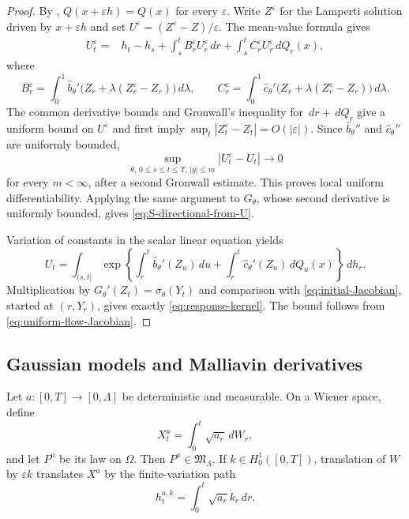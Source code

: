 \documentclass[11pt,reqno]{amsart}
\theoremstyle{plain}
\theoremstyle{definition}
\newcommand{\eps}{\varepsilon}
\newcommand{\dd}{\,d}
\newcommand{\abs}[1]{\left\lvert #1\right\rvert}
\begin{document}
\begin{proof}
By ,
\(Q(x+\eps h)=Q(x)\) for every \(\eps\).  Write \(Z^\eps\) for the
Lamperti solution driven by \(x+\eps h\) and set
\(U^\eps=(Z^\eps-Z)/\eps\).  The mean-value formula gives
\begin{align*}
  U_t^\eps
  ={}&h_t-h_s
  +\int_s^t B_r^\eps U_r^\eps\dd r
  +\int_s^t C_r^\eps U_r^\eps\dd Q_r(x),
\end{align*}
where
\[
  B_r^\eps
  =\int_0^1\widehat b_\theta'
    \bigl(Z_r+\lambda(Z_r^\eps-Z_r)\bigr)\dd\lambda,
  \qquad
  C_r^\eps
  =\int_0^1\widehat c_\theta'
    \bigl(Z_r+\lambda(Z_r^\eps-Z_r)\bigr)\dd\lambda.
\]
The common derivative bounds and Gronwall's inequality for
\(\dd r+\dd Q_r\) give a uniform bound on \(U^\eps\) and first imply
\(\sup_t\abs{Z_t^\eps-Z_t}=O(\abs\eps)\).  Since
\(\widehat b_\theta''\) and \(\widehat c_\theta''\) are uniformly bounded,
\[
  \sup_{\theta,\,0\le s\le t\le T,\,|y|\le m}
  \abs{U_t^\eps-U_t}
  \longrightarrow0
\]
for every \(m<\infty\), after a second Gronwall estimate.  This proves local
uniform differentiability.  Applying the same argument to \(G_\theta\),
whose second derivative is uniformly bounded, gives
\eqref{eq:S-directional-from-U}.

Variation of constants in the scalar linear equation yields
\[
  U_t
  =\int_{(s,t]}
  \exp\left\{
    \int_r^t\widehat b_\theta'(Z_u)\dd u
    +\int_r^t\widehat c_\theta'(Z_u)\dd Q_u(x)
  \right\}\dd h_r.
\]
Multiplication by
\(G_\theta'(Z_t)=\sigma_\theta(Y_t)\) and comparison with
\eqref{eq:initial-Jacobian}, started at \((r,Y_r)\), gives exactly
\eqref{eq:response-kernel}.  The bound follows from
\eqref{eq:uniform-flow-Jacobian}.
\end{proof}

\subsection{Gaussian models and Malliavin derivatives}

Let \(a:[0,T]\to[0,\Lambda]\) be deterministic and measurable.  On a
Wiener space, define
\begin{equation}\label{eq:deterministic-Gaussian-driver}
  X_t^a=\int_0^t\sqrt{a_r}\dd W_r,
\end{equation}
and let \(P^a\) be its law on \(\Omega\).  Then
\(P^a\in\mathfrak M_\Lambda\).  If
\(k\in H_0^1([0,T])\), translation of \(W\) by \(\eps k\) translates
\(X^a\) by the finite-variation path
\begin{equation}\label{eq:CM-driver-shift}
  h_t^{a,k}
  =\int_0^t\sqrt{a_r}\dot k_r\dd r.
\end{equation}
\end{document}
